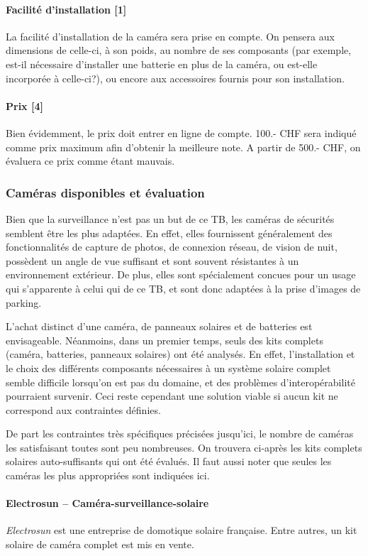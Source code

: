 \paragraph{Facilité d'installation [1]}
La facilité d'installation de la caméra sera prise en compte. On pensera aux dimensions de celle-ci, à son poids, au nombre de ses composants (par exemple, est-il nécessaire d'installer une batterie en plus de la caméra, ou est-elle incorporée à celle-ci?), ou encore aux accessoires fournis pour son installation. 

\paragraph{Prix [4]} Bien évidemment, le prix doit entrer en ligne de compte. 100.- CHF sera indiqué comme prix maximum afin d'obtenir la meilleure note. A partir de 500.- CHF, on évaluera ce prix comme étant mauvais.

\subsubsection{Caméras disponibles et évaluation}
Bien que la surveillance n'est pas un but de ce TB, les caméras de sécurités semblent être les plus adaptées. En effet, elles fournissent généralement des fonctionnalités de capture de photos, de connexion réseau, de vision de nuit, possèdent un angle de vue suffisant et sont souvent résistantes à un environnement extérieur. De plus, elles sont spécialement concues pour un usage qui s'apparente à celui qui de ce TB, et sont donc adaptées à la prise d'images de parking.

L'achat distinct d'une caméra, de panneaux solaires et de batteries est envisageable. Néanmoins, dans un premier temps, seuls des kits complets (caméra, batteries, panneaux solaires) ont été analysés. En effet, l'installation et le choix des différents composants nécessaires à un système solaire complet semble difficile lorsqu'on est pas du domaine, et des problèmes d'interopérabilité pourraient survenir. Ceci reste cependant une solution viable si aucun kit ne correspond aux contraintes définies.

De part les contraintes très spécifiques précisées jusqu'ici, le nombre de caméras les satisfaisant toutes sont peu nombreuses. On trouvera ci-après les kits complets solaires auto-suffisants qui ont été évalués. Il faut aussi noter que seules les caméras les plus appropriées sont indiquées ici.

\paragraph{\textbf{Electrosun} -- Caméra-surveillance-solaire}
\textit{Electrosun} est une entreprise de domotique solaire française. Entre autres, un kit solaire de caméra complet est mis en vente. \autocite{cam:electrosun_site}

